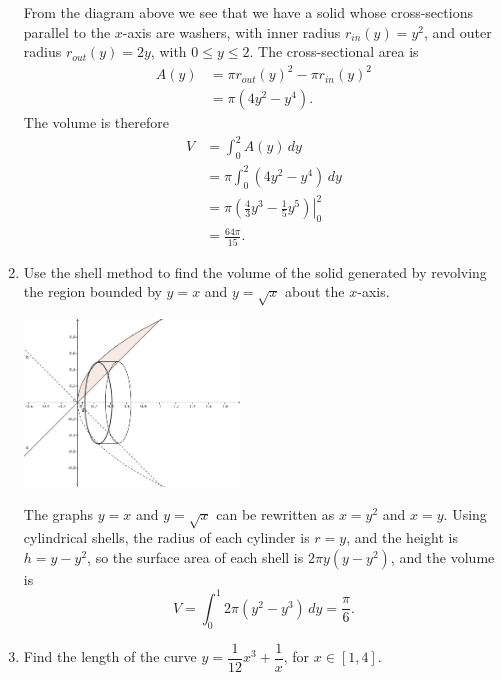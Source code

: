 \documentclass[12pt]{article}
\begin{document}
\begin{enumerate}
\begin{multicols}{2}
From the diagram above we see that we have a solid whose cross-sections parallel to the $x$-axis are washers, with inner radius $r_{in}(y)=y^2$, and outer radius $r_{out}(y)=2y$, with $0\leq y\leq 2$. The cross-sectional area is
\begin{align*}
 A(y) &= \pi r_{out}(y)^2-\pi r_{in}(y)^2 \\&= \pi (4y^2-y^4).
\end{align*}
The volume is therefore
\begin{align*}
 V &= \int_0^2A(y)\,dy\\& = \pi \int_0^2 (4y^2-y^4)\,dy\\& = \pi\left.\left(\frac{4}{3}y^3-\frac{1}{5}y^5\right)\right|_0^2\\& = \frac{64\pi}{15}.
\end{align*}
\end{multicols}

\pagebreak

 \item Use the shell method to find the volume of the solid generated by revolving the region bounded by $y=x$ and $y=\sqrt{x}$ about the $x$-axis.
 
 \medskip
 
 \begin{multicols}{2}
\begin{center}
 \includegraphics[width=0.45\textwidth]{WS5-6.png}
\end{center}

The graphs $y=x$ and $y=\sqrt{x}$ can be rewritten as $x=y^2$ and $x=y$. Using cylindrical shells, the radius of each cylinder is $r=y$, and the height is $h = y-y^2$, so the surface area of each shell is $2\pi y(y-y^2)$, and the volume is
\[
 V = \int_0^1 2\pi (y^2-y^3)\,dy = \frac{\pi}{6}.
\]

 \end{multicols}
 
 \item Find the length of the curve $y=\dfrac{1}{12}x^3+\dfrac{1}{x}$, for $x\in [1,4]$.


\end{enumerate}
\end{document}
